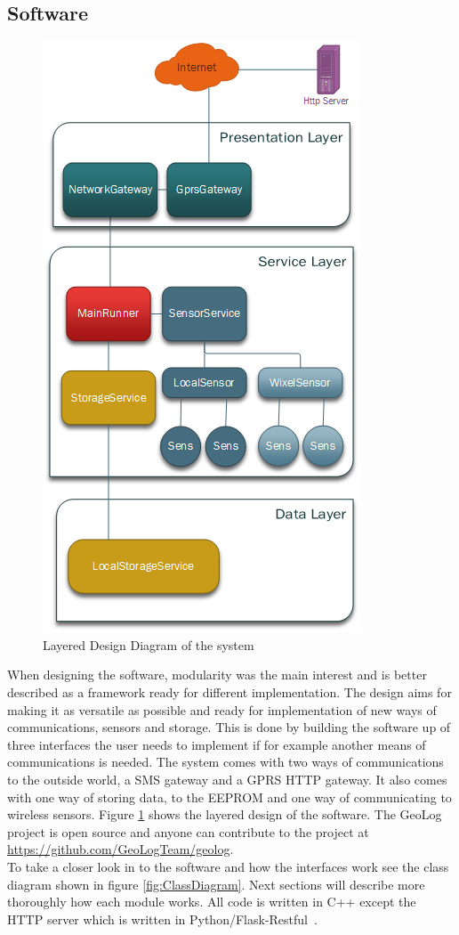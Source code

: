 \subsection{Software}
\begin{figure}
\centering
\includegraphics[width=0.6\linewidth]{graphics/Layering}
\caption{Layered Design Diagram of the system\label{fig:Layering}}
\end{figure}
When designing the software, modularity was the main interest and is better described as
a framework ready for different implementation. The design aims for making
it as versatile as possible and ready for implementation of new ways of communications, sensors and storage. This is done by building the software up of three interfaces the user needs to implement if for example another means of communications is needed. The system comes with two ways of communications to the outside world, a SMS gateway and a GPRS HTTP gateway. It also comes with one way of storing data, to the EEPROM and one way of communicating to wireless sensors. Figure \ref{fig:Layering} shows the layered design of the software. The GeoLog project is open source and anyone can contribute
to the project at \url{https://github.com/GeoLogTeam/geolog}.\\
To take a closer look in to the software and how the interfaces work see the class diagram
shown in figure \ref{fig:ClassDiagram}. Next sections will describe more thoroughly how each module works. All code is written in C++ except the HTTP server which is written in Python/Flask-Restful~\cite{flask-restful}.

